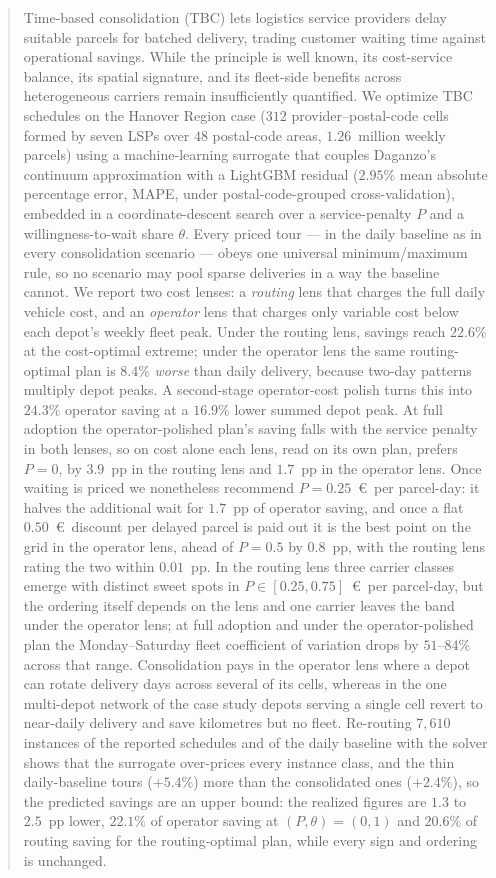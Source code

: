 \documentclass[preprint,12pt,authoryear]{elsarticle}
\begin{document}
\begin{frontmatter}
\begin{abstract}
Time-based consolidation (TBC) lets logistics service providers delay suitable parcels for batched delivery, trading customer waiting time against operational savings. While the principle is well known, its cost-service balance, its spatial signature, and its fleet-side benefits across heterogeneous carriers remain insufficiently quantified. We optimize TBC schedules on the Hanover Region case ($312$ provider--postal-code cells formed by seven LSPs over $48$ postal-code areas, $1.26$~million weekly parcels) using a machine-learning surrogate that couples Daganzo's continuum approximation with a LightGBM residual ($2.95\%$ mean absolute percentage error, MAPE, under postal-code-grouped cross-validation), embedded in a coordinate-descent search over a service-penalty $P$ and a willingness-to-wait share $\theta$. Every priced tour --- in the daily baseline as in every consolidation scenario --- obeys one universal minimum/maximum rule, so no scenario may pool sparse deliveries in a way the baseline cannot. We report two cost lenses: a \emph{routing} lens that charges the full daily vehicle cost, and an \emph{operator} lens that charges only variable cost below each depot's weekly fleet peak. Under the routing lens, savings reach $22.6\%$ at the cost-optimal extreme; under the operator lens the same routing-optimal plan is $8.4\%$ \emph{worse} than daily delivery, because two-day patterns multiply depot peaks. A second-stage operator-cost polish turns this into $24.3\%$ operator saving at a $16.9\%$ lower summed depot peak. At full adoption the operator-polished plan's saving falls with the service penalty in both lenses, so on cost alone each lens, read on its own plan, prefers $P = 0$, by $3.9$~pp in the routing lens and $1.7$~pp in the operator lens. Once waiting is priced we nonetheless recommend $P = 0.25$~\euro\ per parcel-day: it halves the additional wait for $1.7$~pp of operator saving, and once a flat $0.50$~\euro\ discount per delayed parcel is paid out it is the best point on the grid in the operator lens, ahead of $P = 0.5$ by $0.8$~pp, with the routing lens rating the two within $0.01$~pp. In the routing lens three carrier classes emerge with distinct sweet spots in $P \in [0.25, 0.75]$~\euro\ per parcel-day, but the ordering itself depends on the lens and one carrier leaves the band under the operator lens; at full adoption and under the operator-polished plan the Monday--Saturday fleet coefficient of variation drops by $51$--$84\%$ across that range. Consolidation pays in the operator lens where a depot can rotate delivery days across several of its cells, whereas in the one multi-depot network of the case study depots serving a single cell revert to near-daily delivery and save kilometres but no fleet. Re-routing $7{,}610$ instances of the reported schedules and of the daily baseline with the solver shows that the surrogate over-prices every instance class, and the thin daily-baseline tours ($+5.4\%$) more than the consolidated ones ($+2.4\%$), so the predicted savings are an upper bound: the realized figures are $1.3$ to $2.5$~pp lower, $22.1\%$ of operator saving at $(P, \theta) = (0, 1)$ and $20.6\%$ of routing saving for the routing-optimal plan, while every sign and ordering is unchanged.

\end{abstract}
\end{frontmatter}
\end{document}
